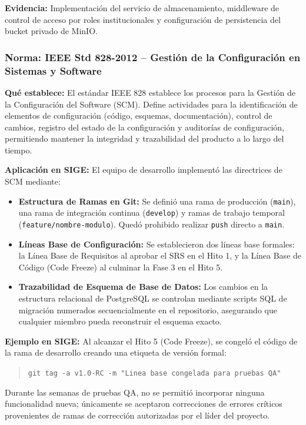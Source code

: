 \documentclass[12pt,a4paper]{article}
\begin{document}
\textbf{Evidencia:}
Implementación del servicio de almacenamiento, middleware de control de acceso por roles institucionales y configuración de persistencia del bucket privado de MinIO.

\subsubsection{Norma: IEEE Std 828-2012 -- Gestión de la Configuración en Sistemas y Software}

\textbf{Qué establece:}
El estándar IEEE 828 establece los procesos para la Gestión de la Configuración del Software (SCM). Define actividades para la identificación de elementos de configuración (código, esquemas, documentación), control de cambios, registro del estado de la configuración y auditorías de configuración, permitiendo mantener la integridad y trazabilidad del producto a lo largo del tiempo.

\textbf{Aplicación en SIGE:}
El equipo de desarrollo implementó las directrices de SCM mediante:
\begin{itemize}[leftmargin=1.5em, itemsep=2pt]
    \item \textbf{Estructura de Ramas en Git:} Se definió una rama de producción (\texttt{main}), una rama de integración continua (\texttt{develop}) y ramas de trabajo temporal (\texttt{feature/nombre-modulo}). Quedó prohibido realizar \texttt{push} directo a \texttt{main}.
    \item \textbf{Líneas Base de Configuración:} Se establecieron dos líneas base formales: la Línea Base de Requisitos al aprobar el SRS en el Hito 1, y la Línea Base de Código (Code Freeze) al culminar la Fase 3 en el Hito 5.
    \item \textbf{Trazabilidad de Esquema de Base de Datos:} Los cambios en la estructura relacional de PostgreSQL se controlan mediante scripts SQL de migración numerados secuencialmente en el repositorio, asegurando que cualquier miembro pueda reconstruir el esquema exacto.
\end{itemize}

\textbf{Ejemplo en SIGE:}
Al alcanzar el Hito 5 (Code Freeze), se congeló el código de la rama de desarrollo creando una etiqueta de versión formal:
\begin{quote}
\texttt{git tag -a v1.0-RC -m "Linea base congelada para pruebas QA"}
\end{quote}
Durante las semanas de pruebas QA, no se permitió incorporar ninguna funcionalidad nueva; únicamente se aceptaron correcciones de errores críticos provenientes de ramas de corrección autorizadas por el líder del proyecto.
\end{document}
